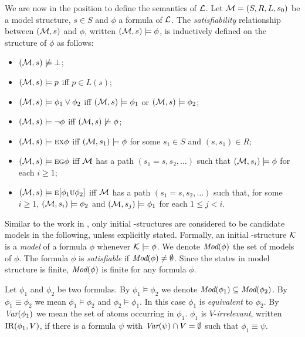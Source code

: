 \documentclass{article}
\begin{document}
We are now in the position to define the semantics of $\cal L$.
Let ${\cal M}=(S,R,L,s_0)$ be a model structure, $s\in S$ and $\phi$ a formula of $\cal L$.
The {\em satisfiability} relationship between $({\cal M},s)$ and $\phi$,
written $({\cal M},s)\models\phi$, is inductively defined on the structure of $\phi$ as follows:

\begin{itemize}
  \item $({\cal M},s)\not\models\bot$;
  \item $({\cal M},s)\models p$ iff $p\in L(s)$;
  \item $({\cal M},s)\models \phi_1\lor\phi_2$ iff
    $({\cal M},s)\models \phi_1$ or $({\cal M},s)\models \phi_2$;
  \item $({\cal M},s)\models \neg\phi$ iff  $({\cal M},s)\not\models\phi$;
  \item $({\cal M},s)\models \textsc{e}\textsc{x}\phi$ iff
    $({\cal M},s_1)\models\phi$ for some $s_1\in S$ and $(s,s_1)\in R$;
  \item $({\cal M},s)\models \textsc{e}\textsc{g}\phi$ iff
    $\cal M$ has a path $(s_1=s,s_2,\ldots)$ such that
    $({\cal M},s_i)\models\phi$ for each $i\ge 1$;
  \item $({\cal M},s)\models \textsc{e}[\phi_1\textsc{u}\phi_2]$ iff
    $\cal M$ has a path $(s_1=s,s_2,\ldots)$ such that, for some $i\ge 1$,
    $({\cal M},s_i)\models\phi_2$ and
    $({\cal M},s_j)\models\phi_1$ for each $1\leq j<i$.
\end{itemize}

Similar to the work in \cite{DBLP:journals/tcs/BrowneCG88,Bolotov:1999:JETAI},
only initial \MPK-structures are considered to be candidate models
in the following, unless explicitly stated. Formally,
an initial \MPK-structure $\cal K$ is a {\em model} of a formula $\phi$
whenever ${\cal K}\models\phi$.
We denote $\textit{Mod}(\phi)$ the set of models of $\phi$.
The formula $\phi$  is {\em satisfiable}
if $\textit{Mod}(\phi)\neq\emptyset$.
Since the states in model structure is finite, $\textit{Mod}(\phi)$
is finite for any formula $\phi$.

Let $\phi_1$ and $\phi_2$ be two formulas.
By $\phi_1\models\phi_2$ we denote $\textit{Mod}(\phi_1)\subseteq\textit{Mod}(\phi_2)$.
By $\phi_1\equiv\phi_2$ we mean $\phi_1\models\phi_2$ and $\phi_2\models\phi_1$.
In this case $\phi_1$ is {\em equivalent} to $\phi_2$.
By $\textit{Var}(\phi_1)$ we mean the set of atoms occurring in $\phi_1$.
 $\phi_1$ is $V$-{\em irrelevant}, written $\textrm{IR}(\phi_1,V)$,
if there is a formula $\psi$ with
$\textit{Var}(\psi)\cap V=\emptyset$ such that $\phi_1\equiv\psi$.
\end{document}
